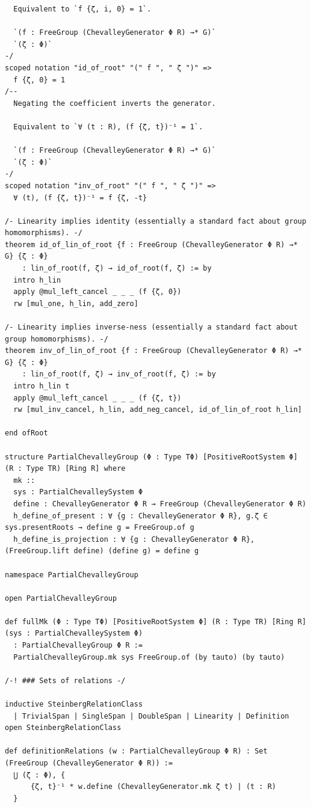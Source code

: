 \documentclass[10pt,a4paper]{article}
\begin{document}
\begin{Verbatim}
  Equivalent to `f {ζ, i, 0} = 1`.

  `(f : FreeGroup (ChevalleyGenerator Φ R) →* G)`
  `(ζ : Φ)`
-/
scoped notation "id_of_root" "(" f ", " ζ ")" =>
  f {ζ, 0} = 1
/--
  Negating the coefficient inverts the generator.

  Equivalent to `∀ (t : R), (f {ζ, t})⁻¹ = 1`.

  `(f : FreeGroup (ChevalleyGenerator Φ R) →* G)`
  `(ζ : Φ)`
-/
scoped notation "inv_of_root" "(" f ", " ζ ")" =>
  ∀ (t), (f {ζ, t})⁻¹ = f {ζ, -t}

/- Linearity implies identity (essentially a standard fact about group homomorphisms). -/
theorem id_of_lin_of_root {f : FreeGroup (ChevalleyGenerator Φ R) →* G} {ζ : Φ}
    : lin_of_root(f, ζ) → id_of_root(f, ζ) := by
  intro h_lin
  apply @mul_left_cancel _ _ _ (f {ζ, 0})
  rw [mul_one, h_lin, add_zero]

/- Linearity implies inverse-ness (essentially a standard fact about group homomorphisms). -/
theorem inv_of_lin_of_root {f : FreeGroup (ChevalleyGenerator Φ R) →* G} {ζ : Φ}
    : lin_of_root(f, ζ) → inv_of_root(f, ζ) := by
  intro h_lin t
  apply @mul_left_cancel _ _ _ (f {ζ, t})
  rw [mul_inv_cancel, h_lin, add_neg_cancel, id_of_lin_of_root h_lin]

end ofRoot

structure PartialChevalleyGroup (Φ : Type TΦ) [PositiveRootSystem Φ] (R : Type TR) [Ring R] where
  mk ::
  sys : PartialChevalleySystem Φ
  define : ChevalleyGenerator Φ R → FreeGroup (ChevalleyGenerator Φ R)
  h_define_of_present : ∀ {g : ChevalleyGenerator Φ R}, g.ζ ∈ sys.presentRoots → define g = FreeGroup.of g
  h_define_is_projection : ∀ {g : ChevalleyGenerator Φ R}, (FreeGroup.lift define) (define g) = define g

namespace PartialChevalleyGroup

open PartialChevalleyGroup

def fullMk (Φ : Type TΦ) [PositiveRootSystem Φ] (R : Type TR) [Ring R] (sys : PartialChevalleySystem Φ)
  : PartialChevalleyGroup Φ R :=
  PartialChevalleyGroup.mk sys FreeGroup.of (by tauto) (by tauto)

/-! ### Sets of relations -/

inductive SteinbergRelationClass
  | TrivialSpan | SingleSpan | DoubleSpan | Linearity | Definition
open SteinbergRelationClass

def definitionRelations (w : PartialChevalleyGroup Φ R) : Set (FreeGroup (ChevalleyGenerator Φ R)) :=
  ⋃ (ζ : Φ), {
      {ζ, t}⁻¹ * w.define (ChevalleyGenerator.mk ζ t) | (t : R)
  }


\end{Verbatim}
\end{document}
